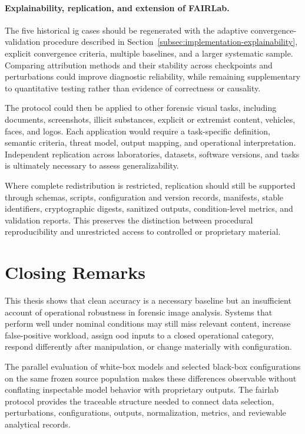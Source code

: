 \paragraph{Explainability, replication, and extension of FAIRLab.}
The five historical \gls{ig} cases should be regenerated with the adaptive
convergence-validation procedure described in
Section~\ref{subsec:implementation-explainability}, explicit convergence
criteria, multiple baselines, and a larger systematic sample. Comparing
attribution methods and their stability across checkpoints and perturbations
could improve diagnostic reliability, while remaining supplementary to
quantitative testing rather than evidence of correctness or causality.

The protocol could then be applied to other forensic visual tasks, including
documents, screenshots, illicit substances, explicit or extremist content,
vehicles, faces, and logos. Each application would require a task-specific
definition, semantic criteria, threat model, output mapping, and operational
interpretation. Independent replication across laboratories, datasets,
software versions, and tasks is ultimately necessary to assess
generalizability.

Where complete redistribution is restricted, replication should still be
supported through schemas, scripts, configuration and version records,
manifests, stable identifiers, cryptographic digests, sanitized outputs,
condition-level metrics, and validation reports. This preserves the distinction
between procedural reproducibility and unrestricted access to controlled or
proprietary material.


\clearpage
\section{Closing Remarks}
\label{sec:conclusions-closing}

This thesis shows that clean accuracy is a necessary baseline but an
insufficient account of operational robustness in forensic image analysis.
Systems that perform well under nominal conditions may still miss relevant
content, increase false-positive workload, assign \gls{ood} inputs to a closed
operational category, respond differently after manipulation, or change
materially with configuration.

The parallel evaluation of white-box models and selected black-box
configurations on the same frozen source population makes these differences
observable without conflating inspectable model behavior with proprietary
outputs. The \gls{fairlab} protocol provides the traceable structure needed to
connect data selection, perturbations, configurations, outputs, normalization,
metrics, and reviewable analytical records.

